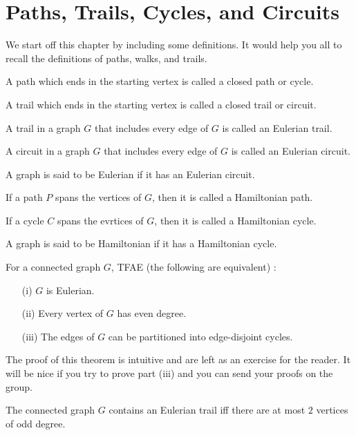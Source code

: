 \documentclass[../basic_graph_theory.tex]{subfiles}
\begin{document}
\chapter{Paths, Trails, Cycles, and Circuits}
\setcounter{chapter}{4} %
\setcounter{section}{4}
\setcounter{equation}{4}
\setcounter{figure}{4}

We start off this chapter by including some definitions. It would help you all to recall the definitions of paths, walks, and trails.

\begin{defn}
    A path which ends in the starting vertex is called a closed path or cycle.
\end{defn}
\begin{defn}
    A trail which ends in the starting vertex is called a closed trail or circuit.
\end{defn}
\begin{defn}
    A trail in a graph $G$ that includes every edge of $G$ is called an Eulerian trail.
\end{defn}
\begin{defn}
    A circuit in a graph $G$ that includes every edge of $G$ is called an Eulerian circuit.
\end{defn}
\begin{defn}
    A graph is said to be Eulerian if it has an Eulerian circuit.
\end{defn}
\begin{defn}
    If a path $P$ spans the vertices of $G$, then it is called a Hamiltonian path.
\end{defn}
\begin{defn}
    If a cycle $C$ spans the evrtices of $G$, then it is called a Hamiltonian cycle.
\end{defn}
\begin{defn}
    A graph is said to be Hamiltonian if it has a Hamiltonian cycle.
\end{defn}

\begin{thm}
    For a connected graph $G$, TFAE (the following are equivalent) :
    \begin{enumerate}
        \item[(i)] $G$ is Eulerian.
        \item[(ii)] Every vertex of $G$ has even degree.
        \item[(iii)] The edges of $G$ can be partitioned into edge-disjoint cycles.
    \end{enumerate}
\end{thm}
The proof of this theorem is intuitive and are left as an exercise for the reader. It will be nice if you try to prove part (iii) and you can send your proofs on the group.
\begin{cor}
    The connected graph $G$ contains an Eulerian trail iff there are at most $2$ vertices of odd degree.
\end{cor}
\end{document}
